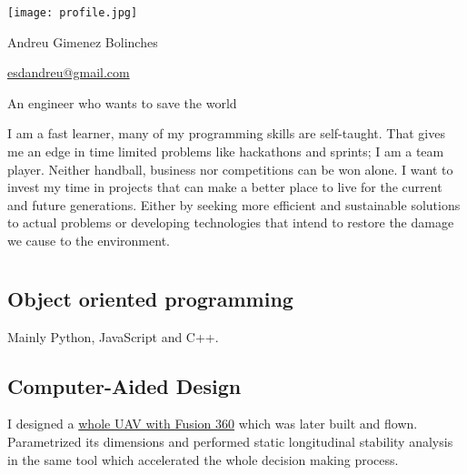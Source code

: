 \documentclass[]{infinity-cv}
\begin{document}
\begingroup
\hypersetup{ hidelinks, pdfnewwindow}
\begin{minipage}{0.15\textwidth} %
    \texttt{[image: profile.jpg]}
\end{minipage}
\hfill
\begin{minipage}{0.6\textwidth}
    \centering
    {\Huge\color{heading}Andreu Gimenez Bolinches}
    
    \medskip
    
    \hfill
    \href{mailto:esdandreu@gmail.com}{
        \faEnvelope\hspace{1pt} esdandreu@gmail.com
    } \hfill
    \href{https://www.linkedin.com/in/andreu-gimenez-bolinches-esdandreu/}{
        \faLinkedin
    } \hfill
    \href{https://esdandreu.github.io/}{\faGlobe} \hfill
    \href{https://stackoverflow.com/users/13180090/andreu-gimenez}{
        \faStackOverflow
    } \hfill
    \href{https://github.com/esdandreu}{\faGithub} \hfill
    \href{https://gitlab.com/esdandreu}{\faGitlab} \hfill
    
    \medskip
    An engineer who wants to save the world
\end{minipage}
\hfill
\begin{minipage}{0.15\textwidth}
\end{minipage}
\medskip
\endgroup

\medskip
I am a fast learner, many of my programming skills are self-taught. That gives
me an edge in time limited problems like hackathons and sprints; I am a team
player. Neither handball, business nor competitions can be won alone. I want to
invest my time in projects that can make a better place to live for the current
and future generations. Either by seeking more efficient and sustainable
solutions to actual problems or developing technologies that intend to restore
the damage we cause to the environment.

\section{\faWrench}
\subsection{Object oriented programming}
Mainly Python, JavaScript and C++.
\subsection{Computer-Aided Design}
I designed a
\href{https://1drv.ms/b/s!AqZvnCxLmXx9hL9DSw-Ee4zU6H5Rcw?e=8hDatB}{whole UAV
with Fusion 360} which was later built and flown. Parametrized its dimensions
and performed static longitudinal stability analysis in the same tool which
accelerated the whole decision making process.
\end{document}
